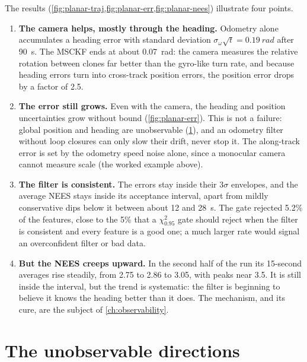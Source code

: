 The results (\cref{fig:planar-traj,fig:planar-err,fig:planar-nees}) illustrate four points.
\begin{enumerate}
  \item \textbf{The camera helps, mostly through the heading.} Odometry alone accumulates a heading error with standard deviation
        $\sigma_\omega\sqrt{t} = \SI{0.19}{rad}$ after \SI{90}{s}. The MSCKF ends at about \SI{0.07}{rad}: the camera measures the relative rotation between clones far
        better than the gyro-like turn rate, and because heading errors turn into cross-track position errors, the position error drops by a
        factor of 2.5.
  \item \textbf{The error still grows.} Even with the camera, the heading and position uncertainties grow without bound (\cref{fig:planar-err}).
        This is not a failure: global position and heading are unobservable (\cref{sec:planar-unobservable}), and an odometry filter without loop
        closures can only slow their drift, never stop it. The along-track error is set by the odometry speed noise alone, since a monocular camera
        cannot measure scale (the worked example above).
  \item \textbf{The filter is consistent.} The errors stay inside their $3\sigma$ envelopes, and the average NEES stays inside its acceptance
        interval, apart from mildly conservative dips below it between about 12 and \SI{28}{s}. The gate rejected 5.2\% of the features, close to the 5\% that a $\chi^2_{0.95}$ gate should reject when the filter is
        consistent and every feature is a good one; a much larger rate would signal an overconfident filter or bad data.
  \item \textbf{But the NEES creeps upward.} In the second half of the run its 15-second averages rise steadily, from 2.75 to 2.86 to 3.05, with peaks near 3.5. It is still inside the
        interval, but the trend is systematic: the filter is beginning to believe it knows the heading better than it does. The mechanism, and its cure, are the subject of \cref{ch:observability}.
\end{enumerate}

\section{The unobservable directions}
\label{sec:planar-unobservable}

